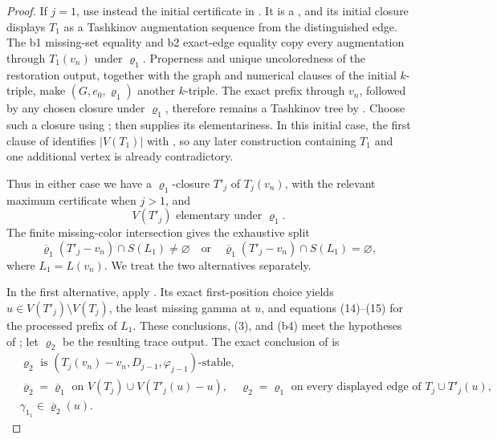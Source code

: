 \begin{proof}
If \(j=1\), use instead the initial certificate in
.  It is a , and its
initial closure displays \(T_1\) as a Tashkinov augmentation sequence
from the distinguished edge.  The b1 missing-set equality and b2
exact-edge equality copy every augmentation through \(T_1(v_n)\) under
\(\varrho_1\).  Properness and unique uncoloredness of the restoration
output, together with the graph and numerical clauses of the initial
\(k\)-triple, make \((G,e_0,\varrho_1)\) another \(k\)-triple.  The
exact prefix through \(v_n\), followed by any chosen closure under
\(\varrho_1\), therefore remains a Tashkinov tree by
.  Choose
such a closure using ; then
 supplies its elementariness.  In this initial case,
the first clause of  identifies
\(|V(T_1)|\) with , so any later construction
containing \(T_1\) and one additional vertex is already contradictory.

Thus in either case we have a \(\varrho_1\)-closure \(T'_j\) of
\(T_j(v_n)\), with the relevant maximum certificate when \(j>1\), and
\[
              V(T'_j)\text{ elementary under }\varrho_1.    \tag{5}
\]
The finite missing-color intersection gives the exhaustive split
\[
 \overline\varrho_1(T'_j-v_n)\cap S(L_1)\ne\varnothing
 \quad\text{or}\quad
 \overline\varrho_1(T'_j-v_n)\cap S(L_1)=\varnothing,       \tag{6}
\]
where \(L_1=L(v_n)\).  We treat the two alternatives separately.

In the first alternative, apply
.  Its exact first-position
choice yields \(u\in V(T'_j)\setminus V(T_j)\), the least missing gamma
at \(u\), and equations (14)--(15) for the processed prefix of \(L_1\).
These conclusions, (3), and (b4) meet the hypotheses of
; let \(\varrho_2\) be the resulting
trace output.  The exact conclusion of 
is
\begin{align*}
 &\varrho_2\text{ is }(T_j(v_n)-v_n,D_{j-1},\varphi_{j-1})
       \text{-stable},                                      &&\tag{c1}\\
 &\overline\varrho_2=\overline\varrho_1
       \text{ on }V(T_j)\cup V(T'_j(u)-u),
   \quad \varrho_2=\varrho_1
       \text{ on every displayed edge of }T_j\cup T'_j(u), &&\tag{c2}\\
 &\gamma_{1_1}\in\overline\varrho_2(u).                    &&\tag{c3}
\end{align*}


\end{proof}
